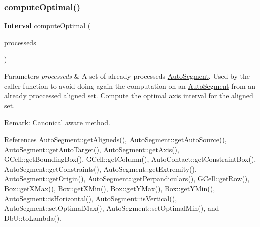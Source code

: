 \mbox{\label{classKatabatic_1_1AutoSegment_aa902247a1e967e52cc3ab087cd52b366}} 
\subsubsection{\texorpdfstring{compute\+Optimal()}{computeOptimal()}}
{\footnotesize\ttfamily \textbf{ Interval} compute\+Optimal (\begin{DoxyParamCaption}\item[{set$<$ \mbox{\hyperlink{classKatabatic_1_1AutoSegment}{Auto\+Segment}} $\ast$$>$ \&}]{processeds }\end{DoxyParamCaption})}


\begin{DoxyParams}{Parameters}
{\em processeds} & A set of already processeds \mbox{\hyperlink{classKatabatic_1_1AutoSegment}{Auto\+Segment}}. Used by the caller function to avoid doing again the computation on an \mbox{\hyperlink{classKatabatic_1_1AutoSegment}{Auto\+Segment}} from an already proccessed aligned set. Compute the optimal axis interval for the aligned set.\\
\hline
\end{DoxyParams}
\begin{DoxyParagraph}{Remark\+: Canonical aware method. }

\end{DoxyParagraph}


References Auto\+Segment\+::get\+Aligneds(), Auto\+Segment\+::get\+Auto\+Source(), Auto\+Segment\+::get\+Auto\+Target(), Auto\+Segment\+::get\+Axis(), G\+Cell\+::get\+Bounding\+Box(), G\+Cell\+::get\+Column(), Auto\+Contact\+::get\+Constraint\+Box(), Auto\+Segment\+::get\+Constraints(), Auto\+Segment\+::get\+Extremity(), Auto\+Segment\+::get\+Origin(), Auto\+Segment\+::get\+Perpandiculars(), G\+Cell\+::get\+Row(), Box\+::get\+X\+Max(), Box\+::get\+X\+Min(), Box\+::get\+Y\+Max(), Box\+::get\+Y\+Min(), Auto\+Segment\+::is\+Horizontal(), Auto\+Segment\+::is\+Vertical(), Auto\+Segment\+::set\+Optimal\+Max(), Auto\+Segment\+::set\+Optimal\+Min(), and Db\+U\+::to\+Lambda().

\mbox{\label{classKatabatic_1_1AutoSegment_a3881efebb7510d9b22e5f89bcd418954}} 
